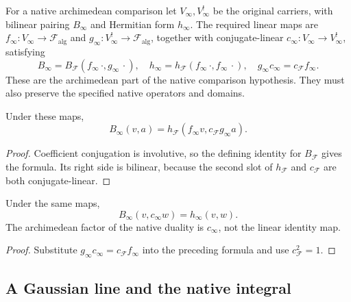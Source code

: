 For a native archimedean comparison let \(V_\infty,V_\infty^!\) be the
original carriers, with bilinear pairing \(B_\infty\) and Hermitian
form \(h_\infty\). The required linear maps are
\(f_\infty:V_\infty\to\mathcal F_{\mathrm{alg}}\) and
\(g_\infty:V_\infty^!\to\mathcal F_{\mathrm{alg}}\), together with
conjugate-linear \(c_\infty:V_\infty\to V_\infty^!\), satisfying
\[
 B_\infty=B_{\mathcal F}(f_\infty\,\cdot,g_\infty\,\cdot),\quad
 h_\infty=h_{\mathcal F}(f_\infty\,\cdot,f_\infty\,\cdot),\quad
 g_\infty c_\infty=c_{\mathcal F}f_\infty.
\]
These are the archimedean part of the native comparison hypothesis.
They must also preserve the specified native operators and domains.

\begin{proposition}
\label{v4-arith:kp:prop:arch-koszul-is-Segal}
Under these maps,
\begin{equation}
 B_\infty(v,a)=h_{\mathcal F}(f_\infty v,c_{\mathcal F}g_\infty a).
 \label{v4-arith:kp:eq:Koszul-infty}
\end{equation}
\end{proposition}
\begin{proof}
Coefficient conjugation is involutive, so the defining identity for
\(B_{\mathcal F}\) gives the formula. Its right side is bilinear,
because the second slot of \(h_{\mathcal F}\) and \(c_{\mathcal F}\)
are both conjugate-linear.
\end{proof}

\begin{corollary}
\label{v4-arith:kp:cor:arch-match}
\label{v4-arith:kp:cor:arch-involution}
Under the same maps,
\begin{equation}
 B_\infty(v,c_\infty w)=h_\infty(v,w).
 \label{v4-arith:kp:eq:arch-match}
\end{equation}
The archimedean factor of the native duality is \(c_\infty\), not the
linear identity map.
\end{corollary}
\begin{proof}
Substitute \(g_\infty c_\infty=c_{\mathcal F}f_\infty\) into the
preceding formula and use \(c_{\mathcal F}^2=1\).
\end{proof}

\subsection{A Gaussian line and the native integral}
\label{v4-arith:kp:arch-Pet}
\label{v4-arith:kp:arch:Pet-infty}

